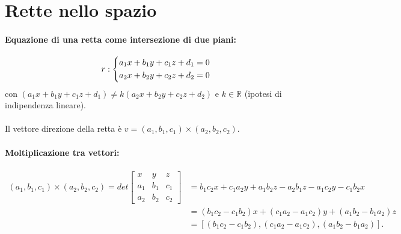 \documentclass[a4paper]{article}
\begin{document}
        \section*{Rette nello spazio}
                \paragraph{Equazione di una retta come intersezione di due piani:}
                        \[
                                r: \begin{dcases}
                                        \begin{aligned}
                                                a_1 x + b_1 y + c_1 z + d_1 & = 0 \\
                                                a_2 x + b_2 y + c_2 z + d_2 & = 0
                                        \end{aligned}
                                \end{dcases}
                        \]
                        con $(a_1 x + b_1 y + c_1 z + d_1) \neq k(a_2 x + b_2 y + c_2 z + d_2)$ e $k \in \mathbb{R}$ (ipotesi di indipendenza lineare).

                \paragraph{}
                        Il vettore direzione della retta \`{e} $ v = (a_1, b_1, c_1) \times (a_2, b_2, c_2) $.

                \paragraph{Moltiplicazione tra vettori:}
                        \[
                                \begin{aligned}
                                        (a_1, b_1, c_1) \times (a_2, b_2, c_2) = det \begin{bmatrix}x & y & z \\ a_1 & b_1 & c_1 \\ a_2 & b_2 & c_2 \end{bmatrix} & = b_1 c_2 x + c_1 a_2 y + a_1 b_2 z - a_2 b_1 z - a_1 c_2 y - c_1 b_2 x \\
                                                   & = (b_1 c_2 - c_1 b_2)x + (c_1 a_2 - a_1 c_2)y + (a_1 b_2 - b_1 a_2)z \\
                                                   & = [ (b_1 c_2 - c_1 b_2), (c_1 a_2 - a_1 c_2), (a_1 b_2 - b_1 a_2)].
                                \end{aligned}
                        \]
\end{document}
